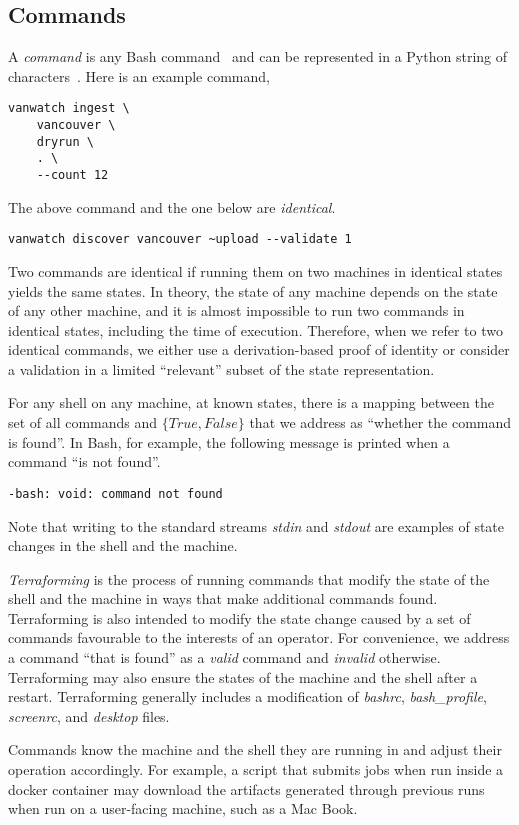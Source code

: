 \subsection{Commands}
\label{commands}

A \emph{command} is any Bash command~ and can be represented in a Python string of characters~. Here is an example command,
%
\begin{verbatim}
vanwatch ingest \
    vancouver \
    dryrun \
    . \
    --count 12
\end{verbatim}
%
The above command and the one below are \emph{identical}.
%
\begin{verbatim}
vanwatch discover vancouver ~upload --validate 1
\end{verbatim}
%
Two commands are identical if running them on two machines in identical states yields the same states. In theory, the state of any machine depends on the state of any other machine, and it is almost impossible to run two commands in identical states, including the time of execution. Therefore, when we refer to two identical commands, we either use a derivation-based proof of identity or consider a validation in a limited ``relevant'' subset of the state representation.

For any shell on any machine, at known states, there is a mapping between the set of all commands and $\{True,False\}$ that we address as ``whether the command is found''. In Bash, for example, the following message is printed when a command ``is not found''.
%
\begin{verbatim}
-bash: void: command not found
\end{verbatim}
%
Note that writing to the standard streams \emph{stdin} and \emph{stdout} are examples of state changes in the shell and the machine. 

\emph{Terraforming} is the process of running commands that modify the state of the shell and the machine in ways that make additional commands found. Terraforming is also intended to modify the state change caused by a set of commands favourable to the interests of an operator. For convenience, we address a command ``that is found'' as a \emph{valid} command and \emph{invalid} otherwise. Terraforming may also ensure the states of the machine and the shell after a restart. Terraforming generally includes a modification of \emph{bashrc}, \emph{bash\_profile}, \emph{screenrc}, and \emph{desktop} files.

Commands know the machine and the shell they are running in and adjust their operation accordingly. For example, a script that submits jobs when run inside a docker container may download the artifacts generated through previous runs when run on a user-facing machine, such as a Mac Book. 




